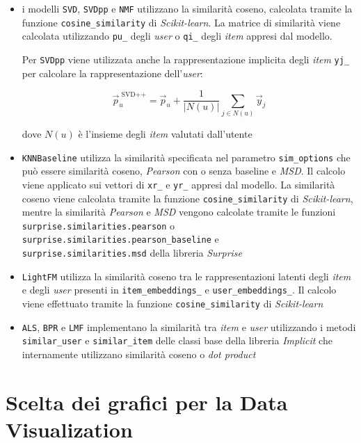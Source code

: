 \begin{itemize}
    \item i modelli \texttt{SVD}, \texttt{SVDpp} e \texttt{NMF} utilizzano la similarità coseno, calcolata tramite la funzione \texttt{cosine\_similarity} di \textit{Scikit-learn}. La matrice di similarità viene calcolata utilizzando \texttt{pu\_} degli \textit{user} o \texttt{qi\_} degli \textit{item} appresi dal modello.
    
    Per \texttt{SVDpp} viene utilizzata anche la rappresentazione implicita degli \textit{item} \texttt{yj\_} per calcolare la rappresentazione dell'\textit{user}:

    \[\vec{p}_u^{\text{ SVD++}} = \vec{p}_u + \frac{1}{|N(u)|} \sum_{j \in N(u)} \vec{y}_j\]

    dove $N(u)$ è l'insieme degli \textit{item} valutati dall'utente

    \item \texttt{KNNBaseline} utilizza la similarità specificata nel parametro \texttt{sim\_options} che può essere similarità coseno, \textit{Pearson} con o senza baseline e \textit{MSD}. Il calcolo viene applicato sui vettori di \texttt{xr\_} e \texttt{yr\_} appresi dal modello. La similarità coseno viene calcolata tramite la funzione \texttt{cosine\_similarity} di \textit{Scikit-learn}, mentre la similarità \textit{Pearson} e \textit{MSD} vengono calcolate tramite le funzioni \texttt{surprise.similarities.pearson} o \\ \texttt{surprise.similarities.pearson\_baseline} e \\ \texttt{surprise.similarities.msd} della libreria \textit{Surprise}
    \item \texttt{LightFM} utilizza la similarità coseno tra le rappresentazioni latenti degli \textit{item} e degli \textit{user} presenti in \texttt{item\_embeddings\_} e \texttt{user\_embeddings\_}. Il calcolo viene effettuato tramite la funzione \texttt{cosine\_similarity} di \textit{Scikit-learn}
    \item \texttt{ALS}, \texttt{BPR} e \texttt{LMF} implementano la similarità tra \textit{item} e \textit{user} utilizzando i metodi \texttt{similar\_user} e \texttt{similar\_item} delle classi base della libreria \textit{Implicit} che internamente utilizzano similarità coseno o \textit{dot product}
\end{itemize}

\section{Scelta dei grafici per la Data Visualization}

